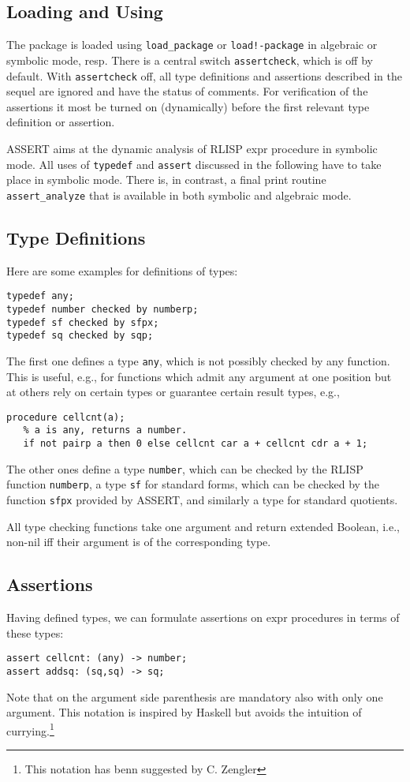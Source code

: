 
\subsection{Loading and Using}
The package is loaded using \texttt{load\_package} or
\texttt{load!-package} in algebraic or symbolic mode, resp. There is a
central switch \texttt{assertcheck}, which is off by default. With
\texttt{assertcheck} off, all type definitions and assertions described
in the sequel are ignored and have the status of comments. For
verification of the assertions it most be turned on (dynamically) before
the first relevant type definition or assertion.

ASSERT aims at the dynamic analysis of RLISP expr procedure in symbolic
mode. All uses of \texttt{typedef} and \texttt{assert} discussed in the
following have to take place in symbolic mode. There is, in contrast, a
final print routine \texttt{assert\_analyze} that is available in both
symbolic and algebraic mode.

\subsection{Type Definitions}
Here are some examples for definitions of types:
\begin{verbatim}
typedef any;
typedef number checked by numberp;
typedef sf checked by sfpx;
typedef sq checked by sqp;
\end{verbatim}
The first one defines a type \texttt{any}, which is not possibly checked
by any function. This is useful, e.g., for functions which admit any
argument at one position but at others rely on certain types or
guarantee certain result types, e.g.,
\begin{verbatim}
procedure cellcnt(a);
   % a is any, returns a number.
   if not pairp a then 0 else cellcnt car a + cellcnt cdr a + 1;
\end{verbatim}

The other ones define a type \texttt{number}, which can be checked by
the RLISP function \texttt{numberp}, a type \texttt{sf} for standard
forms, which can be checked by the function \texttt{sfpx} provided by
ASSERT, and similarly a type for standard quotients.

All type checking functions take one argument and return extended
Boolean, i.e., non-nil iff their argument is of the corresponding type.

\subsection{Assertions}
Having defined types, we can formulate assertions on expr procedures in
terms of these types:
\begin{verbatim}
assert cellcnt: (any) -> number;
assert addsq: (sq,sq) -> sq;
\end{verbatim}
Note that on the argument side parenthesis are mandatory also with only
one argument. This notation is inspired by Haskell but avoids the
intuition of currying.\footnote{This notation has benn suggested by C. Zengler}

